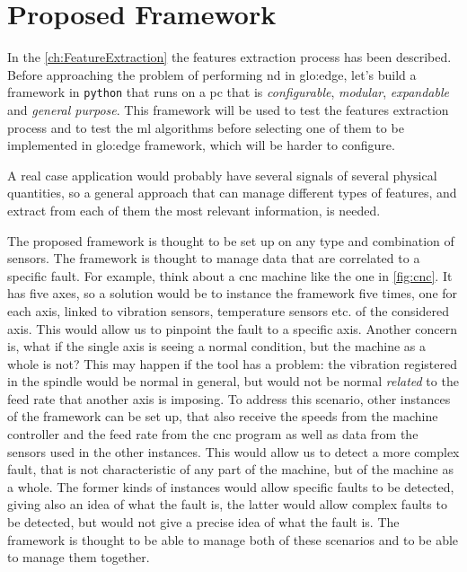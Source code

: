 \chapter{Proposed Framework}
\label{ch:Framework}

In the \autoref{ch:FeatureExtraction} the features extraction process has been described. Before approaching the problem of performing \gls{nd} in \gls{glo:edge}, let's build a framework in \texttt{python} that runs on a \gls{pc} that is \emph{configurable}, \emph{modular}, \emph{expandable} and \emph{general purpose}. This framework will be used to test the features extraction process and to test the \gls{ml} algorithms before selecting one of them to be implemented in \gls{glo:edge} framework, which will be harder to configure.

A real case application would probably have several signals of several physical quantities, so a general approach that can manage different types of features, and extract from each of them the most relevant information, is needed.

The proposed framework is thought to be set up on any type and combination of sensors. The framework is thought to manage data that are correlated to a specific fault. For example, think about a \gls{cnc} machine like the one in \autoref{fig:cnc}. It has five axes, so a solution would be to instance the framework five times, one for each axis, linked to vibration sensors, temperature sensors etc. of the considered axis. This would allow us to pinpoint the fault to a specific axis. Another concern is, what if the single axis is seeing a normal condition, but the machine as a whole is not? This may happen if the tool has a problem: the vibration registered in the spindle would be normal in general, but would not be normal \emph{related} to the feed rate that another axis is imposing. To address this scenario, other instances of the framework can be set up, that also receive the speeds from the machine controller and the feed rate from the \gls{cnc} program as well as data from the sensors used in the other instances. This would allow us to detect a more complex fault, that is not characteristic of any part of the machine, but of the machine as a whole. The former kinds of instances would allow specific faults to be detected, giving also an idea of what the fault is, the latter would allow complex faults to be detected, but would not give a precise idea of what the fault is. The framework is thought to be able to manage both of these scenarios and to be able to manage them together.

